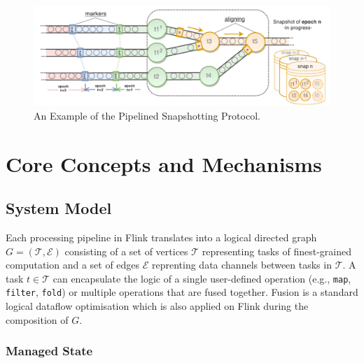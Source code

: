 
\begin{figure}[t!]
\centering
\includegraphics[width=\textwidth]{figures/snapshots-overview.pdf}
\caption{An Example of the Pipelined Snapshotting Protocol.} 
\label{fig:snapshots-overview}
\vspace{-4mm}
\end{figure}

\section{Core Concepts and Mechanisms}
\label{sec:core}

\subsection{System Model}

Each processing pipeline in Flink translates into a logical directed graph $G = (\mathcal{T}, \mathcal{E})$ consisting of a set of vertices $\mathcal{T}$ representing tasks of finest-grained computation and a set of edges $\mathcal{E}$ reprenting data channels between tasks in $\mathcal{T}$. A task $t \in \mathcal{T}$ can encapsulate the logic of a single user-defined operation (e.g., \texttt{map}, \texttt{filter}, \texttt{fold}) or multiple operations that are fused together. Fusion is a standard logical dataflow optimisation \cite{hirzel2014catalog,chambers2010flumejava} which is also applied on Flink during the composition of $G$. 

\subsubsection{Managed State}

